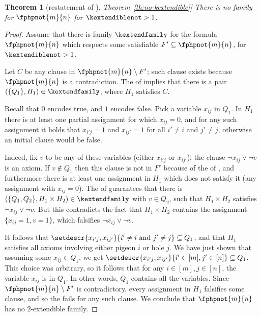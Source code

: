\documentclass[11pt]{article}
\numberwithin{equation}{section}
\newtheorem{theorem}{Theorem}[section]
\theoremstyle{definition}
\theoremstyle{plain}
\newcommand{\expref}[2]{\hyperref[#2]{#1~\ref{#2}}}
\begin{document}
\begin{theorem}[restatement of \expref{Theorem}{th:no-kextendible}]
  There is no \kextendible family for $\fphpnot{m}{n}$ for $\kextendiblenot > 1$.
\end{theorem}

\begin{proof}

  Assume that there is \akextendible family $\kextendfamily$ for
  the formula $\fphpnot{m}{n}$ which respects some satisfiable
  $F'\subseteq \fphpnot{m}{n}$, for $\kextendiblenot>1$.

  Let $C$ be any clause in $\fphpnot{m}{n}\setminus F'$; such clause exists because $\fphpnot{m}{n}$ is a contradiction.
  The \extensionproperty of \kextendfamily implies that there is a
  pair $(\{Q_{1}\}, H_{1} )\in\kextendfamily$, where $H_{1}$ satisfies $C$.

  Recall that $0$ encodes true, and $1$ encodes false. Pick a
  variable $x_{ij}$ in $Q_{1}$. In $H_{1}$ there is at least one
  partial assignment for which $x_{ij}=0$, and for any such assignment
  it holds that $x_{i'j}=1$ and $x_{ij'}=1$ for all $i'\not=i$ and
  $j'\not=j$, otherwise an initial clause would be false.

  Indeed, fix $v$ to be any of these variables (either $x_{i'j}$ or
  $x_{ij'}$); the clause $\lnot{x_{ij}} \lor \lnot{v}$ is an axiom.
  If $v \not\in Q_{1}$ then this clause is not in $F'$ because of the
  \respectfulness of \kextendfamily, and furthermore there is at
  least one assignment in $H_{1}$ which does not satisfy it (\ieComma any assignment with
  $x_{ij}=0$).
  The \extensionproperty of \kextendfamily guarantees that there is
  $(\{Q_{1},Q_{2}\},H_{1}\times H_{2}) \in \kextendfamily$ with $v\in
  Q_{2}$, such that $H_{1}\times H_{2}$ satisfies $\lnot{x_{ij}} \lor
  \lnot{v}$. But this contradicts the fact that $H_{1}\times H_{2}$
  contains the assignment $\{x_{ij}=1,v=1\}$, which falsifies
  $\lnot{x_{ij}} \lor \lnot{v}$.


  It follows that $\setdescr{x_{i'j},x_{ij'}}{i'\not=i \text{\ and\
    } j'\not=j} \subseteq Q_{1}$, and that $H_{1}$ satisfies all
  axioms involving either pigeon $i$ or hole $j$.
  We have just shown that assuming some $x_{ij}\in Q_{1}$, we get
  \mbox{$\setdescr{x_{i'j},x_{ij'}}{i'\in[m], j'\in[n]}\subseteq
    Q_{1}$}. This choice was arbitrary, so it follows that for any
  $i\in[m], j\in[n]$, the variable $x_{ij}$ is in $Q_{1}$. In other
  words, $Q_1$ contains all the variables. Since
  $\fphpnot{m}{n}\setminus F'$ is contradictory, every assignment in
  $H_1$ falsifies some clause, and so the \extensionproperty fails for
  any such clause.  We conclude that $\fphpnot{m}{n}$ has no
  $2$-extendible family.
  \end{proof}
\end{document}
